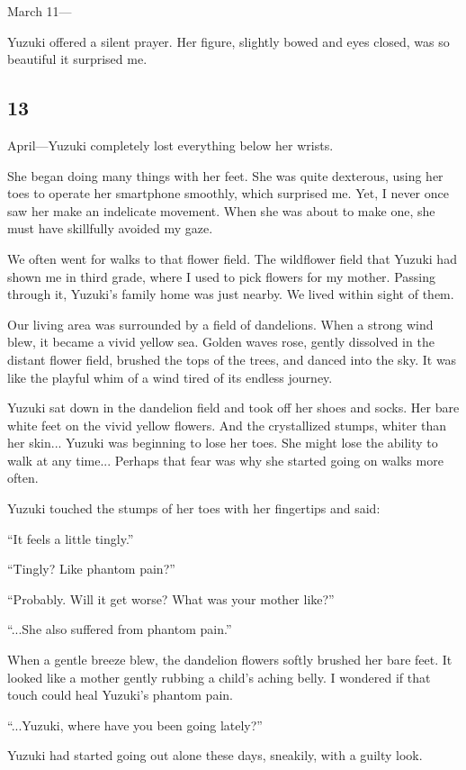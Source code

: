 \documentclass[
    a4paper,
    12pt,
    twoside,
    openany,
    UTF8,
    fontset=windows
]{ctexbook}
\begin{document}
March 11---

Yuzuki offered a silent prayer. Her figure, slightly bowed and eyes closed, was so beautiful it surprised me.


\subsection*{13}

April---Yuzuki completely lost everything below her wrists.

She began doing many things with her feet. She was quite dexterous, using her toes to operate her smartphone smoothly, which surprised me. Yet, I never once saw her make an indelicate movement. When she was about to make one, she must have skillfully avoided my gaze.

We often went for walks to that flower field. The wildflower field that Yuzuki had shown me in third grade, where I used to pick flowers for my mother. Passing through it, Yuzuki's family home was just nearby. We lived within sight of them.

Our living area was surrounded by a field of dandelions. When a strong wind blew, it became a vivid yellow sea. Golden waves rose, gently dissolved in the distant flower field, brushed the tops of the trees, and danced into the sky. It was like the playful whim of a wind tired of its endless journey.

Yuzuki sat down in the dandelion field and took off her shoes and socks. Her bare white feet on the vivid yellow flowers. And the crystallized stumps, whiter than her skin... Yuzuki was beginning to lose her toes. She might lose the ability to walk at any time... Perhaps that fear was why she started going on walks more often.

Yuzuki touched the stumps of her toes with her fingertips and said:

``It feels a little tingly.''

``Tingly? Like phantom pain?''

``Probably. Will it get worse? What was your mother like?''

``...She also suffered from phantom pain.''

When a gentle breeze blew, the dandelion flowers softly brushed her bare feet. It looked like a mother gently rubbing a child's aching belly. I wondered if that touch could heal Yuzuki's phantom pain.

``...Yuzuki, where have you been going lately?''

Yuzuki had started going out alone these days, sneakily, with a guilty look.
\end{document}
